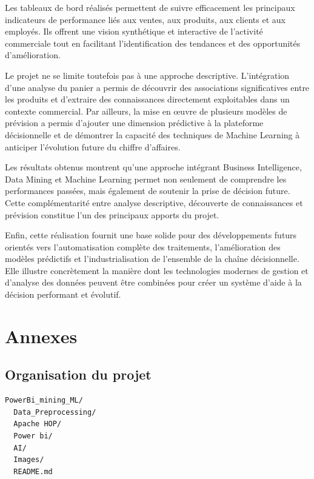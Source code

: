 \documentclass[12pt,a4paper,twoside]{report}
\begin{document}
Les tableaux de bord réalisés permettent de suivre efficacement les principaux indicateurs de performance liés aux ventes, aux produits, aux clients et aux employés. Ils offrent une vision synthétique et interactive de l'activité commerciale tout en facilitant l'identification des tendances et des opportunités d'amélioration.

Le projet ne se limite toutefois pas à une approche descriptive. L'intégration d'une analyse du panier a permis de découvrir des associations significatives entre les produits et d'extraire des connaissances directement exploitables dans un contexte commercial. Par ailleurs, la mise en œuvre de plusieurs modèles de prévision a permis d'ajouter une dimension prédictive à la plateforme décisionnelle et de démontrer la capacité des techniques de Machine Learning à anticiper l'évolution future du chiffre d'affaires.

Les résultats obtenus montrent qu'une approche intégrant Business Intelligence, Data Mining et Machine Learning permet non seulement de comprendre les performances passées, mais également de soutenir la prise de décision future. Cette complémentarité entre analyse descriptive, découverte de connaissances et prévision constitue l'un des principaux apports du projet.

Enfin, cette réalisation fournit une base solide pour des développements futurs orientés vers l'automatisation complète des traitements, l'amélioration des modèles prédictifs et l'industrialisation de l'ensemble de la chaîne décisionnelle. Elle illustre concrètement la manière dont les technologies modernes de gestion et d'analyse des données peuvent être combinées pour créer un système d'aide à la décision performant et évolutif.

\appendix

\chapter{Annexes}

\section{Organisation du projet}

\begin{lstlisting}[caption={Structure synthétique du répertoire projet}]
PowerBi_mining_ML/
  Data_Preprocessing/
  Apache HOP/
  Power bi/
  AI/
  Images/
  README.md
\end{lstlisting}
\end{document}
